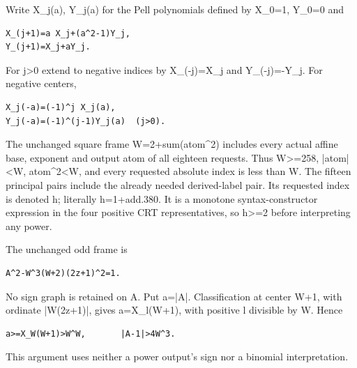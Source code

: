Write X\_\allowbreak{}j(a), Y\_\allowbreak{}j(a) for the Pell polynomials defined by X\_\allowbreak{}0=\allowbreak{}1, Y\_\allowbreak{}0=\allowbreak{}0 and



\begin{verbatim}
X_(j+1)=a X_j+(a^2-1)Y_j,
Y_(j+1)=X_j+aY_j.
\end{verbatim}

For j\textgreater{}\allowbreak{}0 extend to negative indices by X\_\allowbreak{}(-j)=\allowbreak{}X\_\allowbreak{}j and Y\_\allowbreak{}(-j)=\allowbreak{}-Y\_\allowbreak{}j. For negative centers,



\begin{verbatim}
X_j(-a)=(-1)^j X_j(a),
Y_j(-a)=(-1)^(j-1)Y_j(a)  (j>0).
\end{verbatim}

The unchanged square frame W=\allowbreak{}2+\allowbreak{}sum(atom\textasciicircum{}\allowbreak{}2) includes every actual affine base, exponent and output atom of all eighteen requests. Thus W\textgreater{}\allowbreak{}=\allowbreak{}258, |atom|\textless{}\allowbreak{}W, atom\textasciicircum{}\allowbreak{}2\textless{}\allowbreak{}W, and every requested absolute index is less than W. The fifteen principal pairs include the already needed derived-label pair. Its requested index is denoted h; literally h=\allowbreak{}1+\allowbreak{}add.380. It is a monotone syntax-constructor expression in the four positive CRT representatives, so h\textgreater{}\allowbreak{}=\allowbreak{}2 before interpreting any power.



The unchanged odd frame is



\begin{verbatim}
A^2-W^3(W+2)(2z+1)^2=1.
\end{verbatim}

No sign graph is retained on A. Put a=\allowbreak{}|A|. Classification at center W+\allowbreak{}1, with ordinate |W(2z+\allowbreak{}1)|, gives a=\allowbreak{}X\_\allowbreak{}l(W+\allowbreak{}1), with positive l divisible by W. Hence



\begin{verbatim}
a>=X_W(W+1)>W^W,       |A-1|>4W^3.
\end{verbatim}

This argument uses neither a power output's sign nor a binomial interpretation.



